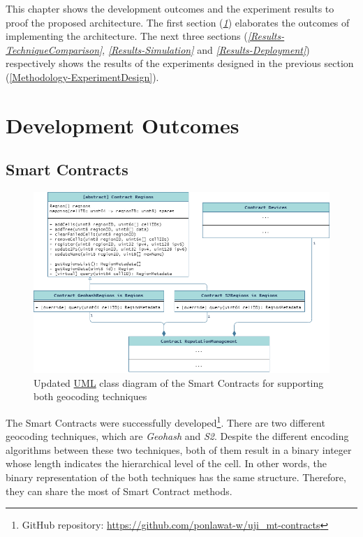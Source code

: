 \npara This chapter shows the development outcomes and the experiment results to proof the proposed architecture.
The first section (\textit{\ref{Results-Development}}) elaborates the outcomes of implementing the architecture.
The next three sections (\textit{\ref{Results-TechniqueComparison}}, \textit{\ref{Results-Simulation}} and \textit{\ref{Results-Deployment}}) respectively shows the results of the experiments designed in the previous section (\ref{Methodology-ExperimentDesign}).

\section{Development Outcomes} \label{Results-Development}

\subsection{Smart Contracts}

\begin{figure}[htb!]
  \centering
  \includegraphics[width=\textwidth]{images/ContractsDeveloped.png}
  \caption{Updated \hyperref[Acronym-UML]{UML} class diagram of the Smart Contracts for supporting both geocoding techniques}
  \label{fig:ContractsDeveloped}
\end{figure}

\npara The Smart Contracts were successfully developed\footnote{GitHub repository: \url{https://github.com/ponlawat-w/uji_mt-contracts}}.
There are two different geocoding techniques, which are \textit{Geohash} and \textit{S2}.
Despite the different encoding algorithms between these two techniques, both of them result in a binary integer whose length indicates the hierarchical level of the cell.
In other words, the binary representation of the both techniques has the same structure.
Therefore, they can share the most of Smart Contract methods.

